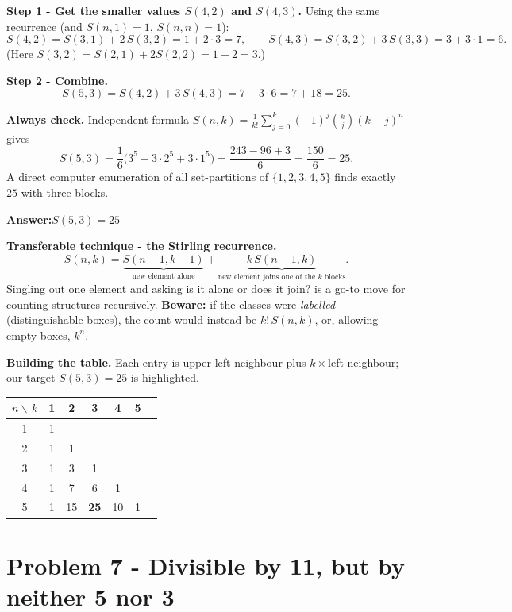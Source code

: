 \documentclass[11pt,a4paper]{article}
\newcommand{\answer}[1]{\begin{answerbox}\centering\textbf{Answer:}\quad #1\end{answerbox}}
\begin{document}
\textbf{Step 1 - Get the smaller values $S(4,2)$ and $S(4,3)$.}
Using the same recurrence (and $S(n,1)=1$, $S(n,n)=1$):
$$S(4,2)=S(3,1)+2\,S(3,2)=1+2\cdot 3=7,\qquad S(4,3)=S(3,2)+3\,S(3,3)=3+3\cdot1=6.$$
(Here $S(3,2)=S(2,1)+2S(2,2)=1+2=3$.)

\textbf{Step 2 - Combine.}
$$S(5,3)=S(4,2)+3\,S(4,3)=7+3\cdot 6=7+18=25.$$

\textbf{Always check.} Independent formula
$S(n,k)=\frac{1}{k!}\sum_{j=0}^{k}(-1)^{j}\binom{k}{j}(k-j)^{n}$ gives
$$S(5,3)=\frac{1}{6}\big(3^5-3\cdot 2^5+3\cdot 1^5\big)=\frac{243-96+3}{6}=\frac{150}{6}=25.$$
A direct computer enumeration of all set-partitions of $\{1,2,3,4,5\}$ finds exactly $25$ with
three blocks. \checkmark

\answer{$S(5,3)=25$}

\begin{methodbox}
\textbf{Transferable technique - the Stirling recurrence.}
$$S(n,k)=\underbrace{S(n-1,k-1)}_{\text{new element alone}}+\underbrace{k\,S(n-1,k)}_{\text{new element joins one of the $k$ blocks}}.$$
Singling out one element and asking \textquotedbl{}is it alone or does it join?\textquotedbl{} is a
go-to move for counting structures recursively. \textbf{Beware:} if the classes were
\emph{labelled} (distinguishable boxes), the count would instead be $k!\,S(n,k)$, or, allowing empty
boxes, $k^{n}$.
\end{methodbox}

\medskip
\textbf{Building the table.} Each entry is \textquotedbl{}upper-left neighbour\textquotedbl{} plus
$k\times$\textquotedbl{}left neighbour\textquotedbl{}; our target $S(5,3)=25$ is highlighted.

\begin{center}
\small
\renewcommand{\arraystretch}{1.15}
\begin{tabular}{@{}c|cccccc@{}}
\toprule
$n \backslash\, k$ & 1 & 2 & 3 & 4 & 5\\
\midrule
1 & 1 &    &    &   & \\
2 & 1 & 1  &    &   & \\
3 & 1 & 3  & 1  &   & \\
4 & 1 & 7  & 6  & 1 & \\
5 & 1 & 15 & \cellcolor{armOrange!30}\textbf{25} & 10 & 1\\
\bottomrule
\end{tabular}
\end{center}

\section*{Problem 7 - Divisible by 11, but by neither 5 nor 3}
\end{document}
